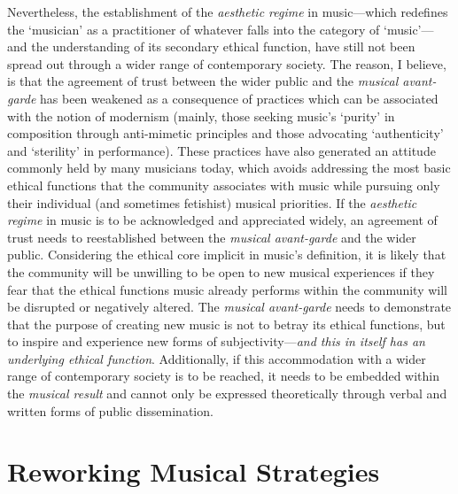 Nevertheless, the establishment of the \emph{aesthetic regime} in music---which redefines the `musician' as a practitioner of whatever falls into the category of `music'---and the understanding of its secondary ethical function, have still not been spread out through a wider range of contemporary society. The reason, I believe, is that the agreement of trust between the wider public and the \emph{musical avant-garde} has been weakened as a consequence of practices which can be associated with the notion of modernism (mainly, those seeking music's `purity'  in composition through anti-mimetic principles and those advocating `authenticity' and `sterility' in performance). These practices have also generated an attitude commonly held by many musicians today, which avoids addressing the most basic ethical functions that the community associates with music while pursuing only their individual (and sometimes fetishist) musical priorities. If the \emph{aesthetic regime} in music is to be acknowledged and appreciated widely, an agreement of trust needs to reestablished between the \emph{musical avant-garde} and the wider public. Considering the ethical core implicit in music's definition, it is likely that the community will be unwilling to be open to new musical experiences if they fear that the ethical functions music already performs within the community will be disrupted or negatively altered. The \emph{musical avant-garde} needs to demonstrate that the purpose of creating new music is not to betray its ethical functions, but to inspire and experience new forms of subjectivity---\emph{and this in itself has an underlying ethical function}. Additionally, if this accommodation with a wider range of contemporary society is to be reached, it needs to be embedded within the \emph{musical result} and cannot only be expressed theoretically through verbal and written forms of public dissemination.

\section{Reworking Musical Strategies}

